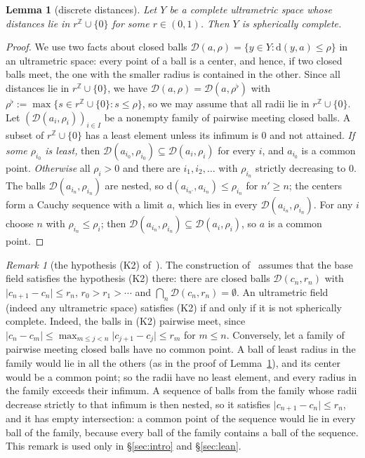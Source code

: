 \documentclass[11pt]{amsart}
\newtheorem{lemma}[theorem]{Lemma}
\theoremstyle{definition}
\theoremstyle{remark}
\newtheorem{remark}[theorem]{Remark}
\numberwithin{equation}{section}
\newcommand{\Z}{\mathbb{Z}}
\newcommand{\cD}{\mathcal{D}}
\newcommand{\abs}[1]{\lvert #1\rvert}
\begin{document}
\begin{lemma}[discrete distances]\label{lem:discdist}
Let $Y$ be a complete ultrametric space whose distances lie in $r^\Z\cup\{0\}$ for some $r\in(0,1)$. Then $Y$ is
spherically complete.
\end{lemma}

\begin{proof}
We use two facts about closed balls $\cD(a,\rho)=\{y\in Y:\mathrm d(y,a)\le\rho\}$ in an ultrametric space: every point
of a ball is a center, and hence, if two closed balls meet, the one with the smaller radius is contained in the other.
Since all distances lie in $r^\Z\cup\{0\}$, we have $\cD(a,\rho)=\cD(a,\rho^\flat)$ with
$\rho^\flat:=\max\{s\in r^\Z\cup\{0\}:s\le\rho\}$, so we may assume that all radii lie in $r^\Z\cup\{0\}$. Let
$(\cD(a_i,\rho_i))_{i\in I}$ be a nonempty family of pairwise meeting closed balls. A subset of $r^\Z\cup\{0\}$ has a
least element unless its infimum is $0$ and not attained. \emph{If some $\rho_{i_0}$ is least,} then
$\cD(a_{i_0},\rho_{i_0})\subseteq\cD(a_i,\rho_i)$ for every $i$, and $a_{i_0}$ is a common point. \emph{Otherwise} all
$\rho_i>0$ and there are $i_1,i_2,\dots$ with $\rho_{i_n}$ strictly decreasing to $0$. The balls
$\cD(a_{i_n},\rho_{i_n})$ are nested, so $\mathrm d(a_{i_{n'}},a_{i_n})\le\rho_{i_n}$ for $n'\ge n$; the centers form a
Cauchy sequence with a limit $a$, which lies in every $\cD(a_{i_n},\rho_{i_n})$. For any $i$ choose $n$ with
$\rho_{i_n}\le\rho_i$; then $\cD(a_{i_n},\rho_{i_n})\subseteq\cD(a_i,\rho_i)$, so $a$ is a common point.
\end{proof}

\begin{remark}[the hypothesis (K2) of~\cite{M}]\label{rem:K2}
The construction of~\cite{M} assumes that the base field satisfies the hypothesis (K2) there: there are closed balls
$\cD(c_n,r_n)$ with $\abs{c_{n+1}-c_n}\le r_n$, $r_0>r_1>\cdots$ and $\bigcap_n\cD(c_n,r_n)=\emptyset$. An ultrametric
field (indeed any ultrametric space) satisfies (K2) if and only if it is not spherically complete. Indeed, the balls
in (K2) pairwise meet, since $\abs{c_n-c_m}\le\max_{m\le j<n}\abs{c_{j+1}-c_j}\le r_m$ for $m\le n$. Conversely, let a
family of pairwise meeting closed balls have no common point. A ball of least radius in the family would lie in all
the others (as in the proof of Lemma~\ref{lem:discdist}), and its center would be a common point; so the radii have
no least element, and every radius in the
family exceeds their infimum. A sequence of balls from the family whose radii decrease strictly to that infimum is
then nested, so it satisfies $\abs{c_{n+1}-c_n}\le r_n$, and it has empty intersection: a common point of the sequence
would lie in every ball of the family, because every ball of the family contains a ball of the sequence. This remark
is used only in \S\ref{sec:intro} and \S\ref{sec:lean}.
\end{remark}
\end{document}
